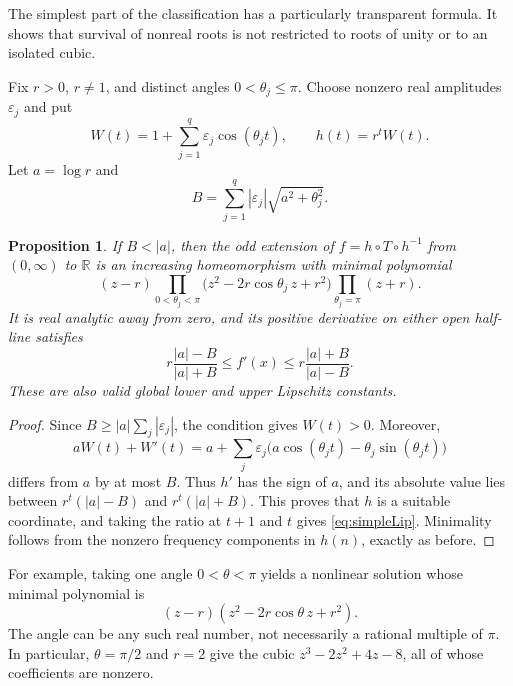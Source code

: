 \documentclass[11pt,letterpaper]{article}
\newtheorem{proposition}[theorem]{Proposition}
\theoremstyle{definition}
\theoremstyle{remark}
\newcommand{\R}{\mathbb R}
\begin{document}
The simplest part of the classification has a particularly transparent
formula. It shows that survival of nonreal roots is not restricted to
roots of unity or to an isolated cubic.

Fix $r>0$, $r\ne1$, and distinct angles
$0<\theta_j\le\pi$. Choose nonzero real amplitudes $\varepsilon_j$ and put
\begin{equation}
 W(t)=1+\sum_{j=1}^q\varepsilon_j\cos(\theta_jt),\qquad
 h(t)=r^tW(t).
 \label{eq:simpleH}
\end{equation}
Let $a=\log r$ and
\begin{equation}
 B=\sum_{j=1}^q|\varepsilon_j|\sqrt{a^2+\theta_j^2}.
 \label{eq:Bbound}
\end{equation}

\begin{proposition}
\label{prop:squarefree}
If $B<|a|$, then the odd extension of
$f=h\circ T\circ h^{-1}$ from $(0,\infty)$ to $\R$ is an increasing
homeomorphism with minimal polynomial
\begin{equation}
 (z-r)
 \prod_{0<\theta_j<\pi}
      \bigl(z^2-2r\cos\theta_j\,z+r^2\bigr)
 \prod_{\theta_j=\pi}(z+r).
 \label{eq:simpleP}
\end{equation}
It is real analytic away from zero, and its positive derivative on either
open half-line satisfies
\begin{equation}
 r\frac{|a|-B}{|a|+B}
   \le f'(x)\le
 r\frac{|a|+B}{|a|-B}.
 \label{eq:simpleLip}
\end{equation}
These are also valid global lower and upper Lipschitz constants.
\end{proposition}

\begin{proof}
Since $B\ge|a|\sum_j|\varepsilon_j|$, the condition gives $W(t)>0$.
Moreover,
\begin{equation}
 aW(t)+W'(t)
 =a+\sum_j\varepsilon_j\bigl(a\cos(\theta_jt)
                                -\theta_j\sin(\theta_jt)\bigr)
\end{equation}
differs from $a$ by at most $B$. Thus $h'$ has the sign of $a$,
and its absolute value lies between $r^t(|a|-B)$ and
$r^t(|a|+B)$. This proves that $h$ is a suitable coordinate, and taking
the ratio at $t+1$ and $t$ gives \eqref{eq:simpleLip}. Minimality follows
from the nonzero frequency components in $h(n)$, exactly as before.
\end{proof}

For example, taking one angle $0<\theta<\pi$ yields a nonlinear solution
whose minimal polynomial is
\begin{equation}
  (z-r)(z^2-2r\cos\theta\,z+r^2).
  \label{eq:generalcubic}
\end{equation}
The angle can be any such real number, not necessarily a rational
multiple of $\pi$. In particular, $\theta=\pi/2$ and $r=2$ give the
cubic $z^3-2z^2+4z-8$, all of whose coefficients are nonzero.
\end{document}
